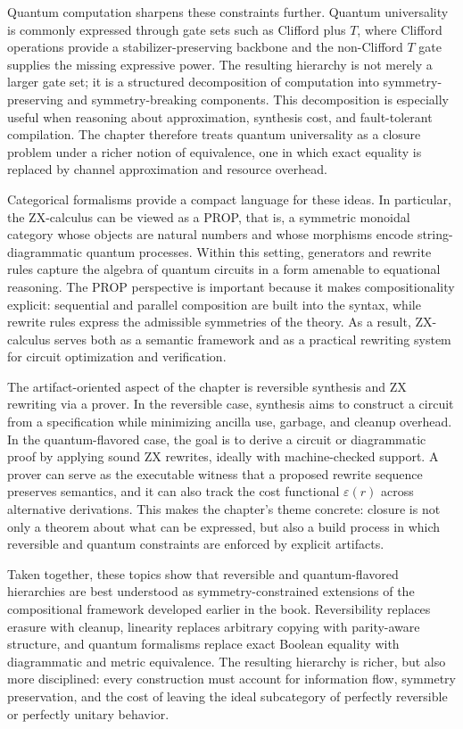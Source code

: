 Quantum computation sharpens these constraints further. Quantum universality is commonly expressed through gate sets such as Clifford plus \(T\), where Clifford operations provide a stabilizer-preserving backbone and the non-Clifford \(T\) gate supplies the missing expressive power. The resulting hierarchy is not merely a larger gate set; it is a structured decomposition of computation into symmetry-preserving and symmetry-breaking components. This decomposition is especially useful when reasoning about approximation, synthesis cost, and fault-tolerant compilation. The chapter therefore treats quantum universality as a closure problem under a richer notion of equivalence, one in which exact equality is replaced by channel approximation and resource overhead.

Categorical formalisms provide a compact language for these ideas. In particular, the ZX-calculus can be viewed as a PROP, that is, a symmetric monoidal category whose objects are natural numbers and whose morphisms encode string-diagrammatic quantum processes. Within this setting, generators and rewrite rules capture the algebra of quantum circuits in a form amenable to equational reasoning. The PROP perspective is important because it makes compositionality explicit: sequential and parallel composition are built into the syntax, while rewrite rules express the admissible symmetries of the theory. As a result, ZX-calculus serves both as a semantic framework and as a practical rewriting system for circuit optimization and verification.

The artifact-oriented aspect of the chapter is reversible synthesis and ZX rewriting via a prover. In the reversible case, synthesis aims to construct a circuit from a specification while minimizing ancilla use, garbage, and cleanup overhead. In the quantum-flavored case, the goal is to derive a circuit or diagrammatic proof by applying sound ZX rewrites, ideally with machine-checked support. A prover can serve as the executable witness that a proposed rewrite sequence preserves semantics, and it can also track the cost functional \(\varepsilon(r)\) across alternative derivations. This makes the chapter’s theme concrete: closure is not only a theorem about what can be expressed, but also a build process in which reversible and quantum constraints are enforced by explicit artifacts.

Taken together, these topics show that reversible and quantum-flavored hierarchies are best understood as symmetry-constrained extensions of the compositional framework developed earlier in the book. Reversibility replaces erasure with cleanup, linearity replaces arbitrary copying with parity-aware structure, and quantum formalisms replace exact Boolean equality with diagrammatic and metric equivalence. The resulting hierarchy is richer, but also more disciplined: every construction must account for information flow, symmetry preservation, and the cost of leaving the ideal subcategory of perfectly reversible or perfectly unitary behavior.

